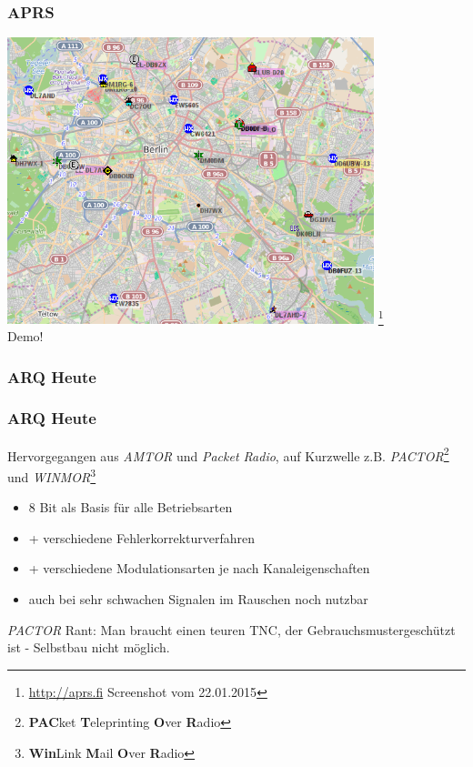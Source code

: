 \begin{frame}
    \frametitle{APRS}

    \begin{center}
        \includegraphics[width=0.8\textwidth]{e16/APRS.png}
        \footnote{\url{http://aprs.fi} Screenshot vom 22.01.2015} \\
        \Large Demo!
    \end{center}

\end{frame}

\subsubsection{ARQ Heute}

\begin{frame}
    \frametitle{ARQ Heute}

    Hervorgegangen aus \emph{AMTOR} und \emph{Packet Radio}, auf Kurzwelle z.B.
    \emph{PACTOR}\footnote{\textbf{PAC}ket \textbf{T}eleprinting \textbf{O}ver
    \textbf{R}adio} und \emph{WINMOR}\footnote{\textbf{Win}Link \textbf{M}ail
    \textbf{O}ver \textbf{R}adio}

    \begin{itemize}
        \item 8 Bit als Basis für alle Betriebsarten
        \item + verschiedene Fehlerkorrekturverfahren
        \item + verschiedene Modulationsarten je nach Kanaleigenschaften
        \item auch bei sehr schwachen Signalen im Rauschen noch nutzbar
    \end{itemize}

    \vspace{0.5cm}

    \emph{PACTOR} Rant: Man braucht einen teuren TNC, der
    Gebrauchsmustergeschützt ist - Selbstbau nicht möglich.  

\end{frame}


